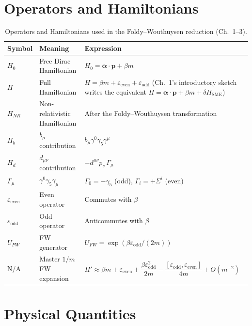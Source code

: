 \documentclass[main]{subfiles}
\begin{document}
\section{Operators and Hamiltonians}

\begin{table}[h]
\centering
\begin{tabular}{@{}l>{\raggedright\arraybackslash}p{4cm}>{\raggedright\arraybackslash}p{6cm}@{}}
\toprule
Symbol & Meaning & Expression \\
\midrule
$H_0$ & Free Dirac Hamiltonian & $H_0=\boldsymbol\alpha\cdot\mathbf p+\beta m$ \\
$H$ & Full Hamiltonian & $H=\beta m+\varepsilon_{\text{even}}+\varepsilon_{\text{odd}}$ (Ch.~1's introductory sketch writes the equivalent $H=\boldsymbol\alpha\cdot\mathbf p+\beta m+\delta H_{\mathrm{SME}}$) \\
$H_{NR}$ & Non-relativistic Hamiltonian & After the Foldy--Wouthuysen transformation \\
$H_b$ & $b_\mu$ contribution & $b_\mu\gamma^0\gamma_5\gamma^\mu$ \\
$H_d$ & $d_{\mu\nu}$ contribution & $-d^{\mu\nu}p_\nu\,\Gamma_\mu$ \\
$\Gamma_\mu$ & $\gamma^0\gamma_5\gamma_\mu$ & $\Gamma_0=-\gamma_5$ (odd), $\Gamma_i=+\Sigma^i$ (even) \\
$\varepsilon_{\text{even}}$ & Even operator & Commutes with $\beta$ \\
$\varepsilon_{\text{odd}}$ & Odd operator & Anticommutes with $\beta$ \\
$U_{FW}$ & FW generator & $U_{FW}=\exp\!\left(\beta\varepsilon_{\text{odd}}/(2m)\right)$ \\
N/A & Master $1/m$ FW expansion & $H'\approx\beta m+\varepsilon_{\text{even}}+\dfrac{\beta\varepsilon_{\text{odd}}^2}{2m}-\dfrac{[\varepsilon_{\text{odd}},\varepsilon_{\text{even}}]}{4m}+O(m^{-2})$ \\
\bottomrule
\end{tabular}
\caption{Operators and Hamiltonians used in the Foldy--Wouthuysen reduction (Ch.~1--3).}
\label{tab:app-operators}
\end{table}

\section{Physical Quantities}
\end{document}
